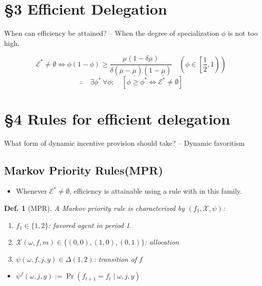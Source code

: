 \documentclass[11pt,a4paper,dvipdfmx]{article}
\newtheorem{df}{Def.}
\newcommand{\mE}{\mathcal{E}}
\newcommand{\mX}{\mathcal{X}}
\renewcommand{\bar}{\overline}
\newcommand{\equi}{\Longleftrightarrow}
\newcommand{\1}{\mathbbm{1}}
\begin{document}


\newpage
\section*{\S3 Efficient Delegation}
When can efficiency be attained?
-- When the degree of specialization $\phi$ is not too high.

$$
\mE^* \neq \emptyset \equi \phi(1 - \phi) \geq \frac{\underline{\mu}(1 - \delta \bar{\mu})}{\delta (\bar{\mu} - \underline{\mu})(1 - \underline{\mu})}
\quad \left(\phi \in \left[\frac{1}{2}, 1 \right) \right)
$$
$$
\therefore \quad \exists \phi^* \ \forall \phi; \quad [\phi \geq \phi^* \equi \mE^* \neq \emptyset]
$$

\section*{\S4 Rules for efficient delegation}
What form of dynamic incentive provision should take?
-- Dynamic favoritism

\subsection*{Markov Priority Rules(MPR)}
\begin{itemize}
	\item Whenever $\mE^* \neq \emptyset$, efficiency is attainable using a rule with in this family.
\end{itemize}

\begin{df}[MPR]
	A Markov priority rule is characterized by $(f_1, \mX, \psi)$:
	\begin{enumerate}
		\item $f_1 \in \{1,2\}$: favored agent in period 1.
		\item $\mX(\omega, f, m)\in \{(0,0), (1,0), (0,1)\}$: allocation
		\item $\psi(\omega, f, j, y) \in \Delta(1,2)$: transition of $f$
	\end{enumerate}
\end{df}

\begin{itemize}
	\item $\psi^f(\omega, j, y) := \Pr(f_{t+1} = f_t \mid \omega, j, y)$
\end{itemize}
\end{document}
